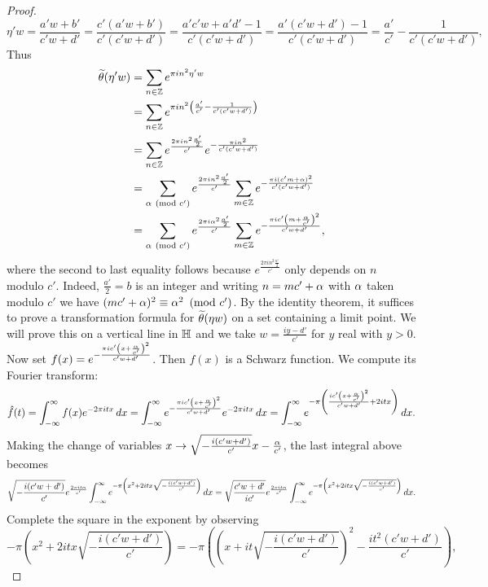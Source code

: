 \documentclass[12pt,oneside]{book}
\begin{document}
\begin{proof}
        \[
          \eta' w = \frac{a'w+b'}{c'w+d'} = \frac{c'(a'w+b')}{c'(c'w+d')} = \frac{a'c'w+a'd'-1}{c'(c'w+d')} = \frac{a'(c'w+d')-1}{c'(c'w+d')} = \frac{a'}{c'}-\frac{1}{c'(c'w+d')},
        \]
        Thus
        \begin{align*}
          \widetilde{\theta}(\eta'w) &= \sum_{n \in \mathbb{Z}}e^{\pi in^{2}\eta'w} \\
          &= \sum_{n \in \mathbb{Z}}e^{\pi in^{2}\left(\frac{a'}{c'}-\frac{1}{c'(c'w+d')}\right)} \\
          &= \sum_{n \in \mathbb{Z}}e^{\frac{2\pi in^{2}\frac{a'}{2}}{c'}}e^{-\frac{\pi in^{2}}{c'(c'w+d')}} \\
          &= \sum_{\alpha \ \left(\text{mod }c'\right)}e^{\frac{2\pi in^{2}\frac{a'}{2}}{c'}}\sum_{m \in \mathbb{Z}}e^{-\frac{\pi i(c'm+\alpha)^{2}}{c'(c'w+d')}} \\
          &= \sum_{\alpha \ \left(\text{mod }c'\right)}e^{\frac{2\pi i\alpha^{2}\frac{a'}{2}}{c'}}\sum_{m \in \mathbb{Z}}e^{-\frac{\pi ic'\left(m+\frac{\alpha}{c'}\right)^{2}}{c'w+d'}},
        \end{align*}
        where the second to last equality follows because $e^{\frac{2\pi in^{2}\frac{a'}{2}}{c'}}$ only depends on $n$ modulo $c'$. Indeed, $\frac{a'}{2} = b$ is an integer and writing $n = mc'+\alpha$ with $\alpha$ taken modulo $c'$ we have $(mc'+\alpha)^{2} \equiv \alpha^{2} \ \left(\text{mod }c'\right)$. By the identity theorem, it suffices to prove a transformation formula for $\widetilde{\theta}(\eta w)$ on a set containing a limit point. We will prove this on a vertical line in $\mathbb{H}$ and we take $w = \frac{iy-d'}{c'}$ for $y$ real with $y > 0$. Now set $f(x) = e^{-\frac{\pi ic'\left(x+\frac{\alpha}{c'}\right)^{2}}{c'w+d'}}$. Then $f(x)$ is a Schwarz function. We compute its Fourier transform:
        \[
          \hat{f}(t) = \int_{-\infty}^{\infty}f(x)e^{-2\pi itx}\,dx = \int_{-\infty}^{\infty}e^{-\frac{\pi ic'\left(x+\frac{\alpha}{c'}\right)^{2}}{c'w+d'}}e^{-2\pi itx}\,dx = \int_{-\infty}^{\infty}e^{-\pi\left(\frac{ic'\left(x+\frac{\alpha}{c'}\right)^{2}}{c'w+d'}+2itx\right)}\,dx.
        \]
        Making the change of variables $x \to \sqrt{-\frac{i(c'w+d')}{c'}}x-\frac{\alpha}{c'}$, the last integral above becomes
        \[
          \sqrt{-\frac{i(c'w+d')}{c'}}e^{\frac{2\pi i t\alpha}{c'}}\int_{-\infty}^{\infty}e^{-\pi\left(x^{2}+2itx\sqrt{-\frac{i(c'w+d')}{c'}}\right)}\,dx = \sqrt{\frac{c'w+d'}{ic'}}e^{\frac{2\pi i t\alpha}{c'}}\int_{-\infty}^{\infty}e^{-\pi\left(x^{2}+2itx\sqrt{-\frac{i(c'w+d')}{c'}}\right)}\,dx.
        \]
        Complete the square in the exponent by observing
        \[
          -\pi\left(x^{2}+2itx\sqrt{-\frac{i(c'w+d')}{c'}}\right) = -\pi\left(\left(x+it\sqrt{-\frac{i(c'w+d')}{c'}}\right)^{2}-\frac{it^{2}(c'w+d')}{c'}\right),
\]
\end{proof}
\end{document}
